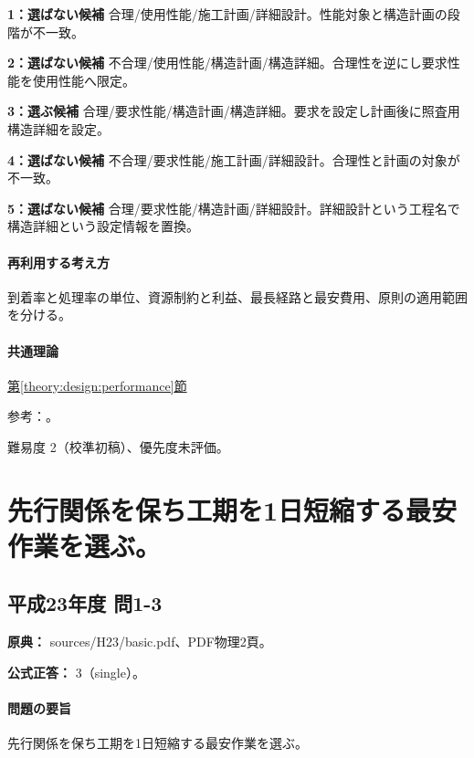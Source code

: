 \noindent\textbf{1：選ばない候補} 合理/使用性能/施工計画/詳細設計。性能対象と構造計画の段階が不一致。\par

\noindent\textbf{2：選ばない候補} 不合理/使用性能/構造計画/構造詳細。合理性を逆にし要求性能を使用性能へ限定。\par

\noindent\textbf{3：選ぶ候補} 合理/要求性能/構造計画/構造詳細。要求を設定し計画後に照査用構造詳細を設定。\par

\noindent\textbf{4：選ばない候補} 不合理/要求性能/施工計画/詳細設計。合理性と計画の対象が不一致。\par

\noindent\textbf{5：選ばない候補} 合理/要求性能/構造計画/詳細設計。詳細設計という工程名で構造詳細という設定情報を置換。\par

\paragraph{再利用する考え方} 到着率と処理率の単位、資源制約と利益、最長経路と最安費用、原則の適用範囲を分ける。

\paragraph{共通理論} \hyperref[theory:design:performance]{第\ref*{theory:design:performance}節}

\par 参考：\cite{design48_mlit}。

\par 難易度 2（校準初稿）、優先度未評価。

\section{先行関係を保ち工期を1日短縮する最安作業を選ぶ。}

\subsection{平成23年度 問1-3}
\label{q:h23-reg-basic-1-3}

\noindent\textbf{原典：} sources/H23/basic.pdf、PDF物理2頁。

\textbf{公式正答：} 3（single）。

\paragraph{問題の要旨} 先行関係を保ち工期を1日短縮する最安作業を選ぶ。

